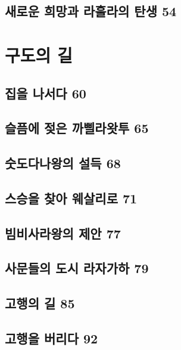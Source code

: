 \documentclass[12pt, a4paper, oneside]{book}
\let\stdsection\section
\renewcommand\section{\newpage\stdsection}
\begin{document}
%
	\section{새로운 희망과 라훌라의 탄생 54}




	\chapter{구도의 길}
	\noptcrule
	\parttoc			


	\section{집을 나서다 60 }

	\section{슬픔에 젖은 까삘라왓투 65 }

	\section{숫도다나왕의 설득 68 }

	\section{스승을 찾아 웨살리로 71 }

	\section{빔비사라왕의 제안 77 }

	\section{사문들의 도시 라자가하 79 }

	\section{고행의 길 85 }

	\section{고행을 버리다 92	}
\end{document}
